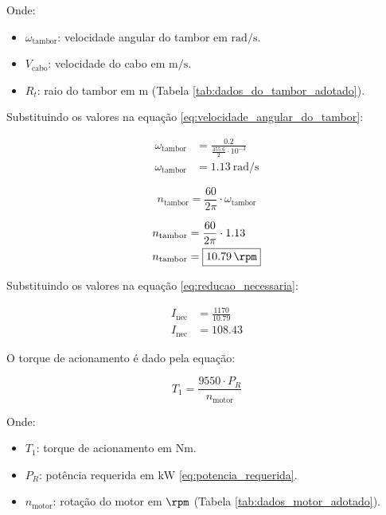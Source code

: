 Onde:

\begin{itemize}[leftmargin=1.25cm]
  \item $\omega_{\text{tambor}}$: velocidade angular do tambor em $\si{\radian\per\second}$.
  \item $V_{\text{cabo}}$: velocidade do cabo em $\si{\meter\per\second}$.
  \item $R_t$: raio do tambor em $\si{\meter}$ (Tabela \ref{tab:dados_do_tambor_adotado}).
\end{itemize}

\vspace{1em}

Substituindo os valores na equação \eqref{eq:velocidade_angular_do_tambor}:

\begin{align*}
  \omega_{\text{tambor}} & = \frac{\num{0.2}}{\frac{\num{355.6}}{2} \cdot 10^{-3}} \\
  \omega_{\text{tambor}} & = \boxed{\SI{1.13}{\radian\per\second}}
\end{align*}

\begin{equation}
  n_{\text{tambor}} = \frac{60}{2 \pi} \cdot \omega_{\text{tambor}}
  \label{eq:rotacao_do_tambor}
\end{equation}

\begin{align*}
  n_{\text{tambor}} & = \frac{60}{2 \pi} \cdot \num{1.13} \\
  n_{\text{tambor}} & = \boxed{\SI{10.79}{\rpm}}
\end{align*}

Substituindo os valores na equação \eqref{eq:reducao_necessaria}:

\begin{align*}
  I_{\text{nec}} & = \frac{1170}{\num{10.79}} \\
  I_{\text{nec}} & = \boxed{\num{108.43}}
\end{align*}

O torque de acionamento é dado pela equação:

\begin{equation}
  T_1 = \frac{9550 \cdot P_R}{n_{\text{motor}}}
  \label{eq:torque_acionamento}
\end{equation}

Onde:

\begin{itemize}[leftmargin=1.25cm]
  \item $T_1$: torque de acionamento em $\si{\newton\meter}$.
  \item $P_R$: potência requerida em $\si{\kilo\watt}$ \eqref{eq:potencia_requerida}.
  \item $n_{\text{motor}}$: rotação do motor em $\si{\rpm}$ (Tabela \ref{tab:dados_motor_adotado}).
\end{itemize}

